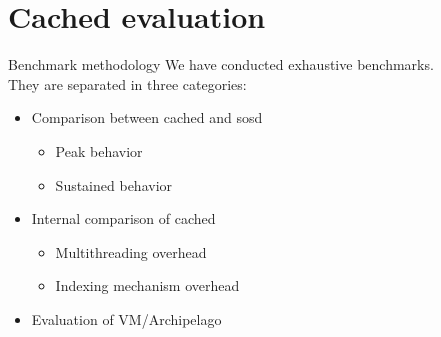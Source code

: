 \section{Cached evaluation}

\begin{frame}{Benchmark methodology}
We have conducted exhaustive benchmarks.\\
They are separated in three categories:

\begin{itemize}
	\item Comparison between cached and sosd
		\begin{itemize}
			\item Peak behavior
			\item Sustained behavior
		\end{itemize}
	\item Internal comparison of cached
		\begin{itemize}
			\item Multithreading overhead
			\item Indexing mechanism overhead
		\end{itemize}
	\item Evaluation of VM/Archipelago
\end{itemize}

\end{frame}

